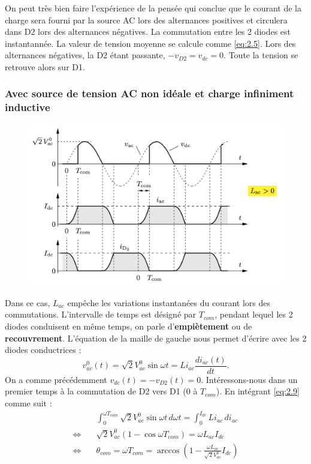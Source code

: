 			On peut très bien faire l'expérience de la pensée qui conclue que le courant de la charge sera fourni par la source AC lors des alternances positives et circulera dans D2 lors des alternances négatives. La commutation entre les 2 diodes est instantannée. La valeur de tension moyenne se calcule comme \eqref{eq:2.5}. Lors des alternances négatives, la D2 étant passante, $-v_{D2} = v_{dc} = 0$. Toute la tension se retrouve alors sur D1.  
			
		\subsubsection{Avec source de tension AC non idéale et charge infiniment inductive}
			\begin{figure}
			\vspace{-5mm}
			\includegraphics[scale=0.3]{ch2/6}
			\end{figure}
			Dans ce cas, $L_{ac}$ empêche les variations instantanées du courant lors des commutations. L'intervalle de temps est désigné par $T_{com}$, pendant lequel les 2 diodes conduisent en même temps, on parle d'\textbf{empiètement} ou de \textbf{recouvrement}. L'équation de la maille de gauche nous permet d'écrire avec les 2 diodes conductrices : 
			\begin{equation}
				v_{ac}^0 (t) = \sqrt{2} V_{ac}^0 \sin \omega t = Li_{ac}\frac{di_{ac}(t)}{dt}.
				\label{eq:2.9}
			\end{equation}
			On a comme précédemment $v_{dc}(t) = - v_{D2}(t) = 0$. Intéressons-nous dans un premier temps à la commutation de D2 vers D1 (0 à $T_{com}$). En intégrant \eqref{eq:2.9} comme suit : 
			\begin{equation}
			\begin{aligned}
				&\int _0 ^{\omega T_{com}} \sqrt{2} V_{ac}^0 \sin \omega t \, d\omega t = \int _0 ^{I_{dc}} Li_{ac}\, di_{ac} \\
				\Leftrightarrow \quad &\sqrt{2} V_{ac}^0 (1- \cos \omega T_{com}) = \omega L_{ac} I_{dc}\\
				\Leftrightarrow \quad &\theta _{com} = \omega T_{com} = \arccos \left( 1 - \frac{\omega L_{ac}}{\sqrt{2} V_{ac}^0}I_{dc} \right)
				\end{aligned}
			\end{equation}			 
